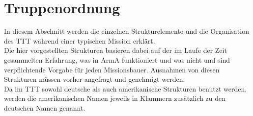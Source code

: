 \chapter{Truppenordnung}
In diesem Abschnitt werden die einzelnen Strukturelemente und die Organisation des \ac{TTT} während einer typischen Mission erklärt.\\
Die hier vorgestellten Strukturen basieren dabei auf der im Laufe der Zeit gesammelten Erfahrung, was in ArmA funktioniert und was nicht und sind verpflichtende Vorgabe für jeden Missionsbauer. Ausnahmen von diesen Strukturen müssen vorher angefragt und genehmigt werden.\\
Da im \ac{TTT} sowohl deutsche als auch amerikanische Strukturen benutzt werden, werden die amerikanischen Namen jeweils in Klammern zusätzlich zu den deutschen Namen genannt.











